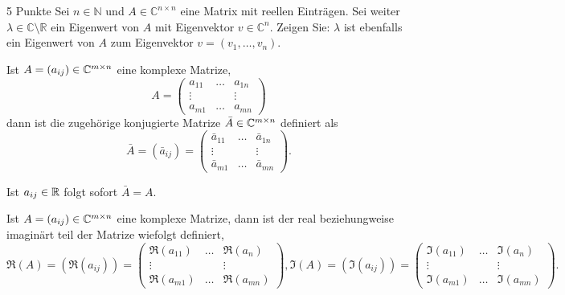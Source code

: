 \documentclass{problemset}
\begin{document}
\begin{problem}{5 Punkte}
Sei $n \in \mathbb{N}$ und $A \in \mathbb{C}^{n \times n}$ eine Matrix mit
reellen Einträgen. Sei weiter $\lambda \in \mathbb{C} \setminus \mathbb{R}$ ein
Eigenwert von $A$ mit Eigenvektor $v \in \mathbb{C}^n$. Zeigen Sie: $\lambda$
ist ebenfalls ein Eigenwert von $A$ zum Eigenvektor $v = (v_1, \dots, v_n)$.

\begin{definition}
    Ist \(A = (a_{ij}) \in \mathbb{C}^{m \times n}\) eine komplexe Matrize,
    \[
        A=
        \begin{pmatrix}
            a_{11} & \dots & a_{1n} \\
            \vdots &       & \vdots \\
            a_{m1} & \dots & a_{mn}
        \end{pmatrix}
    \]
    dann ist die zugehörige konjugierte Matrize \(\bar{A} \in \mathbb{C}^{m
        \times n}\) definiert als \[
        \bar{A} = (\bar{a}_{ij}) = \begin{pmatrix}
            \bar{a}_{11} & \dots & \bar{a}_{1n} \\
            \vdots       &       & \vdots       \\
            \bar{a}_{m1} & \dots & \bar{a}_{mn}
        \end{pmatrix}.
    \]

    Ist \(a_{ij} \in \mathbb{R}\) folgt sofort \(\bar{A} = A\).
\end{definition}

\begin{definition}
    Ist \(A = (a_{ij}) \in \mathbb{C}^{m \times n}\) eine komplexe Matrize,
    dann ist der real beziehungweise imaginärt teil der Matrize wiefolgt definiert, \[
        \Re(A) = (\Re(a_{ij})) = \begin{pmatrix}
            \Re(a_{11}) & \dots & \Re(a_{n})  \\
            \vdots      &       & \vdots      \\
            \Re(a_{m1}) & \dots & \Re(a_{mn})
        \end{pmatrix}, \Im(A) = (\Im(a_{ij})) = \begin{pmatrix}
            \Im(a_{11}) & \dots & \Im(a_{n})  \\
            \vdots      &       & \vdots      \\
            \Im(a_{m1}) & \dots & \Im(a_{mn})
        \end{pmatrix}.
    \]


\end{definition}
\end{problem}
\end{document}
